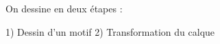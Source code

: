 \documentclass[preview]{standalone}
\begin{document}
\begin{center}
On dessine en deux étapes : 
        
1) Dessin d'un motif
2) Transformation du calque
\end{center}
\end{document}
